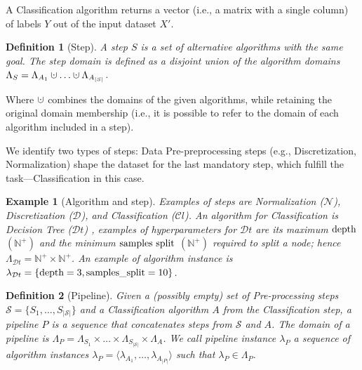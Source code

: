 \documentclass[5p,times]{elsarticle}
\newtheorem{example}{Example}
\newtheorem{definition}{Definition}
\newcommand{\cupdot}{\mathbin{\mathaccent\cdot\cup}}
\begin{document}
A Classification algorithm returns a vector (i.e., a matrix with a single column) of labels $Y$ out of the input dataset $X'$.

\begin{definition}[Step]
A \emph{step} $S$ is a set of alternative algorithms with the same goal.
The \emph{step domain} is defined as a disjoint union of the algorithm domains $\Lambda_S = \Lambda_{A_1} \cupdot \ldots \cupdot \Lambda_{A_{|S|}}$.
\end{definition}

Where $\cupdot$ combines the domains of the given algorithms, while retaining the original domain membership (i.e., it is possible to refer to the domain of each algorithm included in a step).

We identify two types of steps: Data Pre-preprocessing steps (e.g., Discretization, Normalization) shape the dataset for the last mandatory step, which fulfill the task---Classification in this case.

\begin{example}[Algorithm and step]
Examples of steps are Normalization ($\mathcal{N}$), Discretization ($\mathcal{D}$), and Classification ($\mathcal{C}l$). 
An algorithm for Classification is Decision Tree  ($\mathcal{D}t$) \cite{DBLP:books/wa/BreimanFOS84}, 
examples of hyperparameters for $\mathcal{D}t$ are its maximum $\textup{depth}$ $(\mathbb{N}^+)$ and the minimum $\textup{samples split}$ $(\mathbb{N}^+)$ required to split a node; hence $\Lambda_{\mathcal{D}t} = \mathbb{N}^+ \times \mathbb{N}^+$.
An example of algorithm instance is $\lambda_{\mathcal{D}t}= \{ \textup{depth}=3,\textup{samples\_split}=10 \}$.
\end{example}

\begin{definition}[Pipeline]
Given a (possibly empty) set of Pre-processing steps $\mathcal{S} = \{S_1,\ldots, S_{|\mathcal{S}|}\}$ and a Classification algorithm $A$ from the Classification step, a \emph{pipeline} $P$ is a sequence that concatenates steps from $\mathcal{S}$ and $A$.
The domain of a pipeline is $\Lambda_P = \Lambda_{S_1} \times \ldots \times \Lambda_{S_{|\mathcal{S}|}} \times \Lambda_A$.
We call \emph{pipeline instance} $\lambda_P$ a sequence of algorithm instances $\lambda_P = \langle \lambda_{A_1}, \ldots, \lambda_{A_{|P|}} \rangle$ such that $\lambda_P \in \Lambda_P$.
\end{definition}
\end{document}
